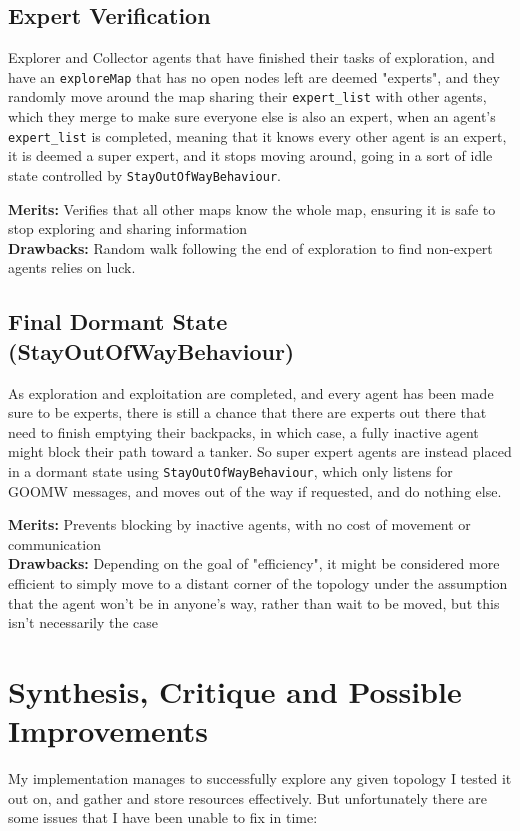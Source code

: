 \documentclass[a4paper, 12pt]{article}
\begin{document}
\subsection{Expert Verification}
Explorer and Collector agents that have finished their tasks of exploration, and have an \texttt{exploreMap} that has no open nodes left are deemed "experts", and they randomly move around the map sharing their \texttt{expert\_list} with other agents, which they merge to make sure everyone else is also an expert, when an agent's \texttt{expert\_list} is completed, meaning that it knows every other agent is an expert, it is deemed a super expert, and it stops moving around, going in a sort of idle state controlled by \texttt{StayOutOfWayBehaviour}.

\textbf{Merits:} Verifies that all other maps know the whole map, ensuring it is safe to stop exploring and sharing information\\
\textbf{Drawbacks:} Random walk following the end of exploration to find non-expert agents relies on luck.

\subsection{Final Dormant State (StayOutOfWayBehaviour)}
As exploration and exploitation are completed, and every agent has been made sure to be experts, there is still a chance that there are experts out there that need to finish emptying their backpacks, in which case, a fully inactive agent might block their path toward a tanker. So super expert agents are instead placed in a dormant state using \texttt{StayOutOfWayBehaviour}, which only listens for GOOMW messages, and moves out of the way if requested, and do nothing else.

\textbf{Merits:} Prevents blocking by inactive agents, with no cost of movement or communication\\
\textbf{Drawbacks:} Depending on the goal of "efficiency", it might be considered more efficient to simply move to a distant corner of the topology under the assumption that the agent won't be in anyone's way, rather than wait to be moved, but this isn't necessarily the case\\


\section{Synthesis, Critique and Possible Improvements}
My implementation manages to successfully explore any given topology I tested it out on, and gather and store resources effectively. But unfortunately there are some issues that I have been unable to fix in time:
\end{document}
